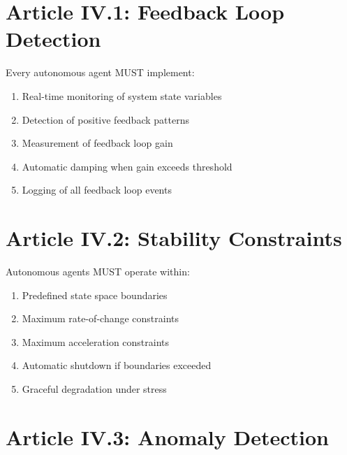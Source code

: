 \vspace{0.5cm}

\section{Article IV.1: Feedback Loop Detection}

\begin{articlebox}
Every autonomous agent MUST implement:
\begin{enumerate}
    \item Real-time monitoring of system state variables
    \item Detection of positive feedback patterns
    \item Measurement of feedback loop gain
    \item Automatic damping when gain exceeds threshold
    \item Logging of all feedback loop events
\end{enumerate}
\end{articlebox}

\vspace{0.5cm}

\section{Article IV.2: Stability Constraints}

\begin{articlebox}
Autonomous agents MUST operate within:
\begin{enumerate}
    \item Predefined state space boundaries
    \item Maximum rate-of-change constraints
    \item Maximum acceleration constraints
    \item Automatic shutdown if boundaries exceeded
    \item Graceful degradation under stress
\end{enumerate}
\end{articlebox}

\vspace{0.5cm}

\section{Article IV.3: Anomaly Detection}

